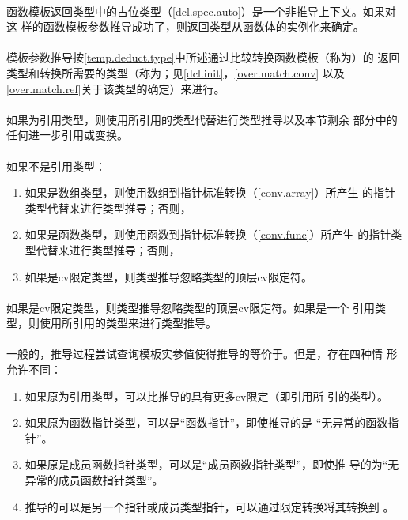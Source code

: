 \paragraph{}
函数模板返回类型中的占位类型（\ref{dcl.spec.auto}）是一个非推导上下文。如果对这
样的函数模板参数推导成功了，则返回类型从函数体的实例化来确定。

\paragraph{}
模板参数推导按\ref{temp.deduct.type}中所述通过比较转换函数模板（称为）的
返回类型和转换所需要的类型（称为；见\ref{dcl.init}，\ref{over.match.conv}
以及\ref{over.match.ref}关于该类型的确定）来进行。

\paragraph{}
如果为引用类型，则使用所引用的类型代替进行类型推导以及本节剩余
部分中的任何进一步引用或变换。

\paragraph{}
如果不是引用类型：
\begin{enumerate}
  \item{如果是数组类型，则使用数组到指针标准转换（\ref{conv.array}）所产生
    的指针类型代替来进行类型推导；否则，}
  \item{如果是函数类型，则使用函数到指针标准转换（\ref{conv.func}）所产生
    的指针类型代替来进行类型推导；否则，}
  \item{如果是cv限定类型，则类型推导忽略类型的顶层cv限定符。}
\end{enumerate}

\paragraph{}
如果是cv限定类型，则类型推导忽略类型的顶层cv限定符。如果是一个
引用类型，则使用所引用的类型来进行类型推导。

\paragraph{}
一般的，推导过程尝试查询模板实参值使得推导的等价于。但是，存在四种情
形允许不同：
\begin{enumerate}
  \item{如果原为引用类型，可以比推导的具有更多cv限定（即引用所
    引的类型）。}
  \item{如果原为函数指针类型，可以是``函数指针''，即使推导的是
    ``无异常的函数指针''。}
  \item{如果原是成员函数指针类型，可以是``成员函数指针类型''，即使推
    导的为``无异常的成员函数指针类型''。}
  \item{推导的可以是另一个指针或成员类型指针，可以通过限定转换将其转换到
    。}
\end{enumerate}

